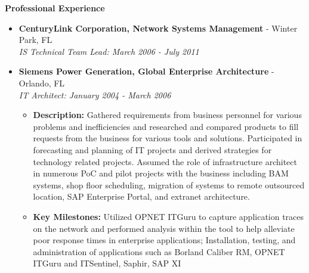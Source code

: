 \documentclass[10pt,oneside]{article}
\newenvironment{ressection}[1]{
	\vspace{4pt}
	\textbf{\selectfont\normalsize#1}
	\begin{itemize}
	\vspace{3pt}
}{
	\end{itemize}
}
\newcommand{\ressubitem}[1]{
	\vspace{-1pt}
	\item \begin{flushleft} #1 \end{flushleft}
}
\newcommand{\resbigitem}[3]{
	\vspace{-5pt}
	\item
	\textbf{#1} - #2 \\
	\textit{#3}
}
\newenvironment{ressubsec}[3]{
	\resbigitem{#1}{#2}{#3}
	\vspace{-2pt}
	\begin{itemize}
}{
	\end{itemize}
}
\begin{document}
\begin{ressection}{Professional Experience}
\begin{ressubsec}{CenturyLink Corporation, Network Systems Management}{Winter Park, FL}{IS Technical Team Lead: March 2006 - July 2011}
	\end{ressubsec}

	\begin{ressubsec}{Siemens Power Generation, Global Enterprise Architecture}{Orlando, FL}{IT Architect: January 2004 - March 2006}

		\ressubitem{\textbf{Description:} Gathered requirements from business personnel for various problems and inefficiencies and researched and compared products to fill requests from the business for various tools and solutions.  Participated in forecasting and planning of IT projects and derived strategies for technology related projects.  Assumed the role of infrastructure architect in numerous PoC and pilot projects with the business including BAM systems, shop floor scheduling, migration of systems to remote outsourced location, SAP Enterprise Portal, and extranet architecture.}

		\ressubitem{\textbf{Key Milestones:} Utilized OPNET ITGuru to capture application traces on the network and performed analysis within the tool to help alleviate poor response times in enterprise applications; Installation, testing, and administration of applications such as Borland Caliber RM, OPNET ITGuru and ITSentinel, Saphir, SAP XI}
	\end{ressubsec}







\end{ressection}

\end{document}
